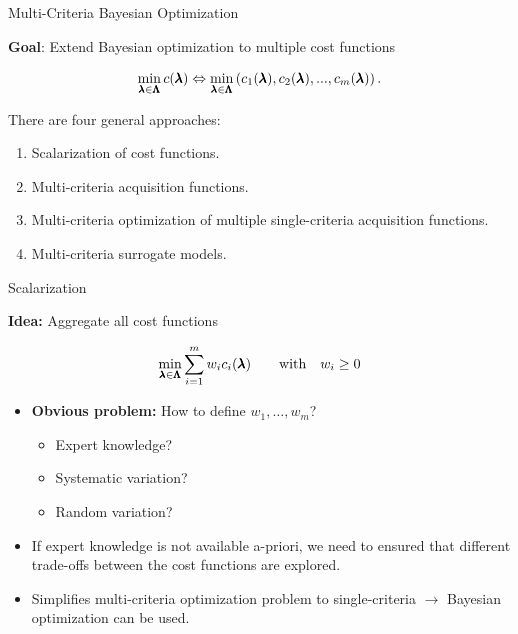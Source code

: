 \begin{frame}{Multi-Criteria Bayesian Optimization}

\textbf{Goal}: Extend Bayesian optimization to multiple cost functions

$$
\min_{\pmb{\lambda} \in \pmb{\Lambda}}  c(\pmb{\lambda}) \Leftrightarrow \min_{\pmb{\lambda} \in \pmb{\Lambda}} \left(c_1(\pmb{\lambda}), c_2(\pmb{\lambda}), ..., c_m(\pmb{\lambda})\right).
$$



There are four general approaches:

\begin{enumerate}
        \item Scalarization of cost functions.
        \item Multi-criteria acquisition functions.
        \item Multi-criteria optimization of multiple single-criteria acquisition functions.
        \item Multi-criteria surrogate models.
\end{enumerate}

\end{frame}

\begin{frame}{Scalarization}

    \textbf{Idea:} Aggregate all cost functions


    $$\min_{\pmb{\lambda} \in \pmb{\Lambda}} \sum_{i = 1}^m w_i c_i(\pmb{\lambda}) \qquad \text{with} \quad w_i \ge 0 $$

    \begin{itemize}
        \item \textbf{Obvious problem:} How to define $w_1, \dots, w_m$?
            \begin{itemize}
                \item Expert knowledge?
                \item Systematic variation?
                \item Random variation?
            \end{itemize}
        \item If expert knowledge is not available a-priori, we need to ensured that different trade-offs between the cost functions are explored.
            \item Simplifies multi-criteria optimization problem to single-criteria $\longrightarrow$ Bayesian optimization can be used.
    \end{itemize}

\end{frame}

